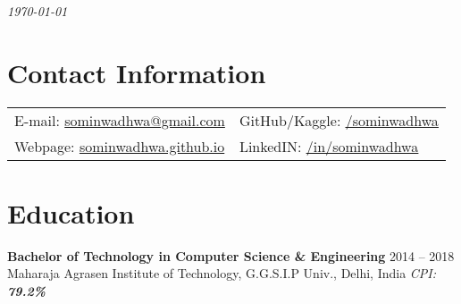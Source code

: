 \documentclass[margin,line]{res}
\begin{document}
 \hfill {\em \today}

\begin{resume}
\section{\sc Contact Information}

\vspace{.025in}
\begin{tabular}{@{}p{3.5in}p{3in}}
{E-mail:}  \href{mailto:sominwadhwa@gmail.com}{sominwadhwa@gmail.com} & {GitHub/Kaggle:} {\href{https://github.com/sominwadhwa}{\underline{/sominwadhwa}}}\\
{Webpage:} {\href{https://sominwadhwa.github.io}{sominwadhwa.github.io}} & {LinkedIN:} {\href{https://www.linkedin.com/in/sominwadhwa/}{\underline{/in/sominwadhwa}}}\\
\end{tabular}

\section{\sc Education}
{\bf Bachelor of Technology in Computer Science \& Engineering} \hfill  2014 -- 2018\\
Maharaja Agrasen Institute of Technology, G.G.S.I.P Univ., Delhi, India \hfill \textit{CPI: {\bf 79.2\%}}


\end{resume}
\end{document}
